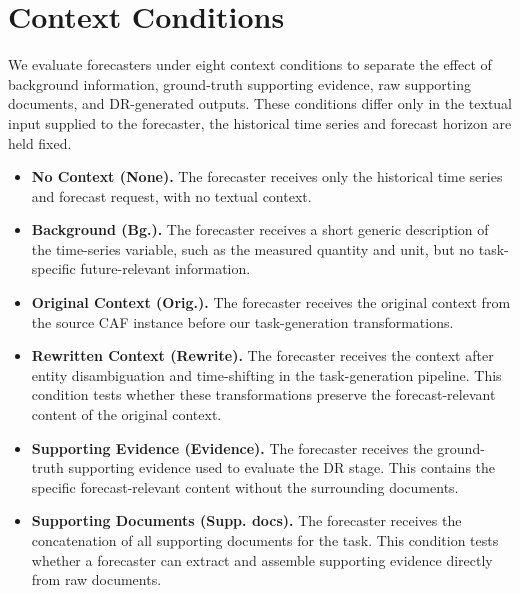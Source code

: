 \documentclass[]{servicenow}
\begin{document}

\section{Context Conditions}
\label{appx:context_modes}

We evaluate forecasters under eight context conditions to separate the effect of background information, ground-truth supporting evidence, raw supporting documents, and DR-generated outputs.
These conditions differ only in the textual input supplied to the forecaster, the historical time series and forecast horizon are held fixed.

\begin{itemize}[leftmargin=*, itemsep=0.2em, topsep=0.2em, parsep=0pt, partopsep=0pt]
    \item \textbf{No Context (None).} The forecaster receives only the historical time series and forecast request, with no textual context.

    \item \textbf{Background (Bg.).} The forecaster receives a short generic description of the time-series variable, such as the measured quantity and unit, but no task-specific future-relevant information.

    \item \textbf{Original Context (Orig.).} The forecaster receives the original context from the source CAF instance before our task-generation transformations.

    \item \textbf{Rewritten Context (Rewrite).} The forecaster receives the context after entity disambiguation and time-shifting in the task-generation pipeline. This condition tests whether these transformations preserve the forecast-relevant content of the original context.

    \item \textbf{Supporting Evidence (Evidence).} The forecaster receives the ground-truth supporting evidence used to evaluate the DR stage. This contains the specific forecast-relevant content without the surrounding documents.

    \item \textbf{Supporting Documents (Supp. docs).} The forecaster receives the concatenation of all supporting documents for the task. This condition tests whether a forecaster can extract and assemble supporting evidence directly from raw documents.


\end{itemize}
\end{document}
